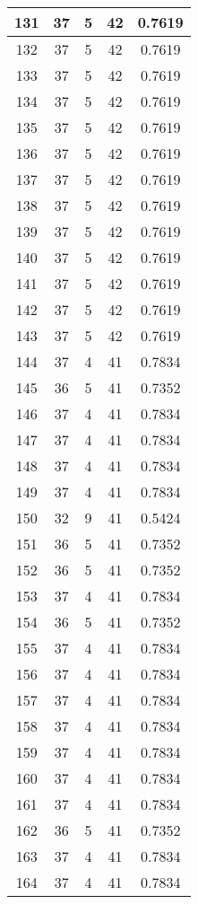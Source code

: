 \documentclass[letterpaper, 12pt]{article}
\begin{document}
\begin{longtable}{|c|c|c|c|c|}
\hline
131 & 37 & 5 & 42 & 0.7619 \\
\hline
132 & 37 & 5 & 42 & 0.7619 \\
\hline
133 & 37 & 5 & 42 & 0.7619 \\
\hline
134 & 37 & 5 & 42 & 0.7619 \\
\hline
135 & 37 & 5 & 42 & 0.7619 \\
\hline
136 & 37 & 5 & 42 & 0.7619 \\
\hline
137 & 37 & 5 & 42 & 0.7619 \\
\hline
138 & 37 & 5 & 42 & 0.7619 \\
\hline
139 & 37 & 5 & 42 & 0.7619 \\
\hline
140 & 37 & 5 & 42 & 0.7619 \\
\hline
141 & 37 & 5 & 42 & 0.7619 \\
\hline
142 & 37 & 5 & 42 & 0.7619 \\
\hline
143 & 37 & 5 & 42 & 0.7619 \\
\hline
144 & 37 & 4 & 41 & 0.7834 \\
\hline
145 & 36 & 5 & 41 & 0.7352 \\
\hline
146 & 37 & 4 & 41 & 0.7834 \\
\hline
147 & 37 & 4 & 41 & 0.7834 \\
\hline
148 & 37 & 4 & 41 & 0.7834 \\
\hline
149 & 37 & 4 & 41 & 0.7834 \\
\hline
150 & 32 & 9 & 41 & 0.5424 \\
\hline
151 & 36 & 5 & 41 & 0.7352 \\
\hline
152 & 36 & 5 & 41 & 0.7352 \\
\hline
153 & 37 & 4 & 41 & 0.7834 \\
\hline
154 & 36 & 5 & 41 & 0.7352 \\
\hline
155 & 37 & 4 & 41 & 0.7834 \\
\hline
156 & 37 & 4 & 41 & 0.7834 \\
\hline
157 & 37 & 4 & 41 & 0.7834 \\
\hline
158 & 37 & 4 & 41 & 0.7834 \\
\hline
159 & 37 & 4 & 41 & 0.7834 \\
\hline
160 & 37 & 4 & 41 & 0.7834 \\
\hline
161 & 37 & 4 & 41 & 0.7834 \\
\hline
162 & 36 & 5 & 41 & 0.7352 \\
\hline
163 & 37 & 4 & 41 & 0.7834 \\
\hline
164 & 37 & 4 & 41 & 0.7834 \\

\end{longtable}
\end{document}
